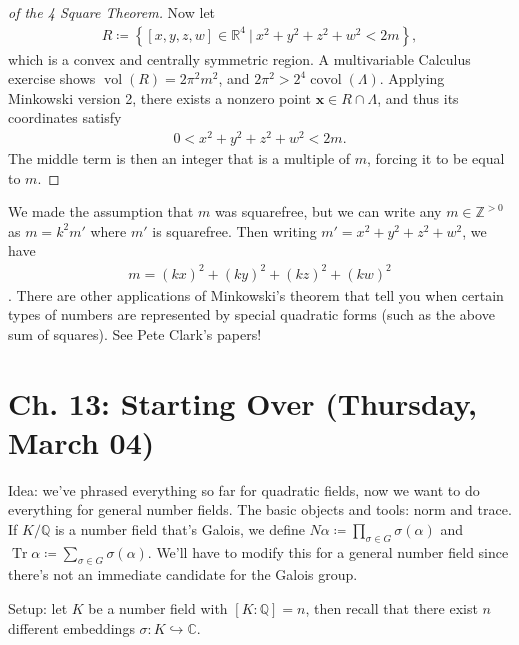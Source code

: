 \begin{proof}[of the 4 Square Theorem]
Now let
\begin{align*}
R \coloneqq\left\{{ {\left[ {x,y,z,w} \right]} \in {\mathbb{R}}^4 {~\mathrel{\Big|}~}x^2 + y^2 + z^2 + w ^2 < 2m  }\right\}
,\end{align*}
which is a convex and centrally symmetric region. A multivariable
Calculus exercise shows \(\operatorname{vol}(R) = 2\pi^2 m^2\), and
\(2\pi^2 > 2^4 \operatorname{covol}( \Lambda)\). Applying Minkowski
version 2, there exists a nonzero point
\(\mathbf{x} \in R \cap\Lambda\), and thus its coordinates satisfy
\begin{align*}
0 < x^2 + y^2 + z^2 + w^2 < 2m
.\end{align*}
The middle term is then an integer that is a multiple of \(m\), forcing
it to be equal to \(m\).

\end{proof}

\begin{remark}

We made the assumption that \(m\) was squarefree, but we can write any
\(m\in {\mathbb{Z}}^{>0}\) as \(m = k^2 m'\) where \(m'\) is squarefree.
Then writing \(m' = x^2 + y^2 + z^2 + w^2\), we have
\begin{align*} m = (kx)^2 + (ky)^2 + (kz)^2 + (kw)^2 \end{align*}
. There are other applications of Minkowski's theorem that tell you when
certain types of numbers are represented by special quadratic forms
(such as the above sum of squares). See Pete Clark's papers!

\end{remark}

\hypertarget{ch.-13-starting-over-thursday-march-04}{%
\section{Ch. 13: Starting Over (Thursday, March
04)}\label{ch.-13-starting-over-thursday-march-04}}

Idea: we've phrased everything so far for quadratic fields, now we want
to do everything for general number fields. The basic objects and tools:
norm and trace. If \(K/{\mathbb{Q}}\) is a number field that's Galois,
we define \(N \alpha \coloneqq\prod_{ \sigma \in G} \sigma( \alpha)\)
and
\(\operatorname{Tr}\alpha \coloneqq\sum_{ \sigma\in G } \sigma( \alpha)\).
We'll have to modify this for a general number field since there's not
an immediate candidate for the Galois group.

Setup: let \(K\) be a number field with \([K: {\mathbb{Q}}] = n\), then
recall that there exist \(n\) different embeddings
\(\sigma: K \hookrightarrow{\mathbb{C}}\).

